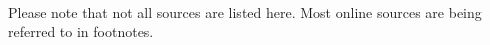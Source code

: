 \documentclass[11pt,a4paper,oneside,notitlepage]{book}
\begin{document}



\newpage

\pagestyle{empty}





\pagestyle{fancy}
\frontmatter

\tableofcontents


\mainmatter










\printglossaries

\appendix

% 

\newpage 

\nocite{*}
{}

\paragraph{}
Please note that not all sources are listed here. Most online sources are being referred to in footnotes.
\backmatter

\listoffigures

\newpage

\end{document}
